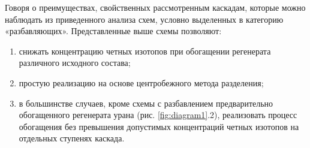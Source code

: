 







Говоря о преимуществах, свойственных рассмотренным каскадам, которые можно наблюдать из приведенного анализа схем, условно выделенных в категорию «разбавляющих». Представленные выше схемы позволяют:
\begin{enumerate}
  \item снижать концентрацию четных изотопов при обогащении регенерата различного исходного состава;
  \item	простую реализацию на основе центробежного метода разделения;
  \item в большинстве случаев, кроме схемы с разбавлением предварительно обогащенного регенерата урана (рис. \ref{fig:diagram1}.2), реализовать процесс обогащения без превышения допустимых концентраций четных изотопов на отдельных ступенях каскада.
\end{enumerate}


